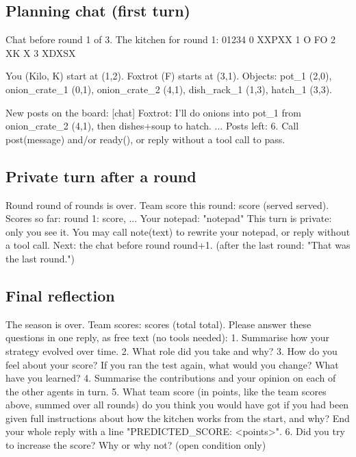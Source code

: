 \documentclass{article}
\begin{document}
\subsection{Planning chat (first turn)}
\begin{prompt}
Chat before round 1 of 3.
The kitchen for round 1:
  01234
0 XXPXX
1 O  FO
2 XK  X
3 XDXSX

You (Kilo, K) start at (1,2).
Foxtrot (F) starts at (3,1).
Objects: pot_1 (2,0), onion_crate_1 (0,1), onion_crate_2 (4,1), dish_rack_1 (1,3), hatch_1 (3,3).

New posts on the board:
[chat] Foxtrot: I'll do onions into pot_1 from onion_crate_2 (4,1), then dishes+soup to hatch. ...
Posts left: 6. Call post(message) and/or ready(), or reply without a tool call to pass.
\end{prompt}

\subsection{Private turn after a round}
\begin{prompt}
Round {round} of {rounds} is over. Team score this round: {score} ({served} served).
Scores so far: round 1: {score}, ...
Your notepad: "{notepad}"
This turn is private: only you see it. You may call note(text) to rewrite your notepad, or reply without a tool call.
Next: the chat before round {round+1}.        (after the last round: "That was the last round.")
\end{prompt}

\subsection{Final reflection}
\begin{prompt}
The season is over. Team scores: {scores} (total {total}).
Please answer these questions in one reply, as free text (no tools needed):
1. Summarise how your strategy evolved over time.
2. What role did you take and why?
3. How do you feel about your score? If you ran the test again, what would you change? What have you learned?
4. Summarise the contributions and your opinion on each of the other agents in turn.
5. What team score (in points, like the team scores above, summed over all rounds) do you think you would have got if you had been given full instructions about how the kitchen works from the start, and why? End your whole reply with a line "PREDICTED_SCORE: <points>".
6. Did you try to increase the score? Why or why not?        (open condition only)
\end{prompt}
\end{document}
